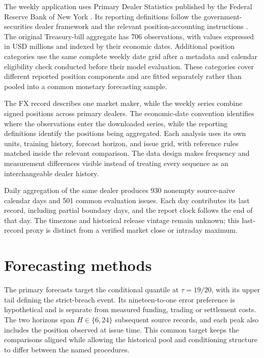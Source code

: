 \documentclass[11pt,a4paper]{article}
\begin{document}
The weekly application uses Primary Dealer Statistics published by the Federal Reserve Bank of New York \citep{nyfeddata}. Its reporting definitions follow the government-securities dealer framework and the relevant position-accounting instructions \citep{fr2004_2013,fr2004_2024}. The original Treasury-bill aggregate has 706 observations, with values expressed in USD millions and indexed by their economic dates. Additional position categories use the same complete weekly date grid after a metadata and calendar eligibility check conducted before their model evaluation. These categories cover different reported position components and are fitted separately rather than pooled into a common monetary forecasting sample.


The FX record describes one market maker, while the weekly series combine signed positions across primary dealers. The economic-date convention identifies where the observations enter the downloaded series, while the reporting definitions identify the positions being aggregated. Each analysis uses its own units, training history, forecast horizon, and issue grid, with reference rules matched inside the relevant comparison. The data design makes frequency and measurement differences visible instead of treating every sequence as an interchangeable dealer history.

Daily aggregation of the same dealer produces 930 nonempty source-naive calendar days and 501 common evaluation issues. Each day contributes its last record, including partial boundary days, and the report clock follows the end of that day. The timezone and historical release vintage remain unknown; this last-record proxy is distinct from a verified market close or intraday maximum.


\FloatBarrier

\section{Forecasting methods}\label{sec:methods}

The primary forecasts target the conditional quantile at \(\tau=19/20\), with its upper tail defining the strict-breach event. Its nineteen-to-one error preference is hypothetical and is separate from measured funding, trading or settlement costs. The two horizons span \(H\in\{6,24\}\) subsequent source records, and each peak also includes the position observed at issue time. This common target keeps the comparisons aligned while allowing the historical pool and conditioning structure to differ between the named procedures.
\end{document}

